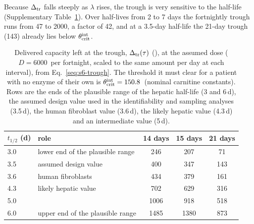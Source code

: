 Because $\Delta_{\mathrm{tr}}$ falls steeply as $\lambda$ rises, the trough is very sensitive to the half-life
(Supplementary Table~\ref{stab:s6-trough}). Over half-lives from 2 to 7 days the fortnightly
trough runs from 47 to 2000\um, a factor of 42, and at a 3.5-day half-life the 21-day trough
(143\um) already lies below $\theta_{\mathrm{crit}}^{\mathrm{int}}$.

\begin{table}[tbp]
\centering
\small
\caption{\label{stab:s6-trough}Delivered capacity left at the trough, $\Delta_{\mathrm{tr}}(\tau)$ (\um), at
the assumed dose ($D=6000$\um\ per fortnight, scaled to the same amount per day at each
interval), from Eq.~\eqref{seq:s6-trough}. The threshold it must clear for a patient with no
enzyme of their own is $\theta_{\mathrm{crit}}^{\mathrm{int}}=150.8$\um\ (nominal carnitine constants). Rows are the ends of the
plausible range of the hepatic half-life (3 and 6\,d), the assumed design value used in the
identifiability and sampling analyses (3.5\,d), the human fibroblast value (3.6\,d), the likely
hepatic value (4.3\,d) and an intermediate value (5\,d).}
\begin{tabular}{@{}llccc@{}}
\toprule
$t_{1/2}$ (d) & role & 14 days & 15 days & 21 days \\
\midrule
3.0 & lower end of the plausible range & 246 & 207 & 71 \\
3.5 & assumed design value & 400 & 347 & 143 \\
3.6 & human fibroblasts~\cite{chandler1985} & 434 & 379 & 161 \\
4.3 & likely hepatic value & 702 & 629 & 316 \\
5.0 & & 1006 & 918 & 518 \\
6.0 & upper end of the plausible range & 1485 & 1380 & 873 \\
\bottomrule
\end{tabular}
\end{table}

